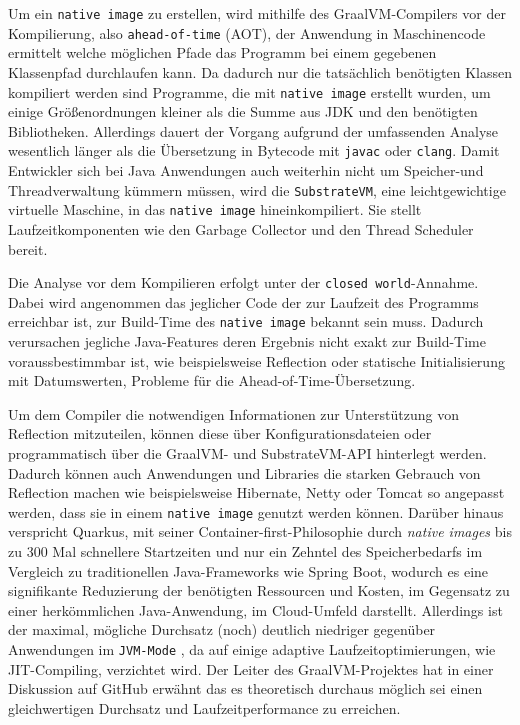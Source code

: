 Um ein \verb|native image| zu erstellen, wird mithilfe des GraalVM-Compilers vor der Kompilierung, also \verb|ahead-of-time| (AOT), der Anwendung in Maschinencode
ermittelt welche möglichen Pfade das Programm bei einem gegebenen Klassenpfad durchlaufen kann. Da dadurch nur die tatsächlich benötigten Klassen
kompiliert werden sind Programme, die mit \verb|native image| erstellt wurden, um einige Größenordnungen kleiner als die Summe aus
JDK und den benötigten Bibliotheken.
Allerdings dauert der Vorgang aufgrund der umfassenden Analyse wesentlich länger als die Übersetzung in Bytecode mit \verb|javac| oder \verb|clang|.
Damit Entwickler sich bei Java Anwendungen auch weiterhin nicht um Speicher-und Threadverwaltung kümmern müssen, wird die \verb|SubstrateVM|, eine
leichtgewichtige virtuelle Maschine, in das \verb|native image| hineinkompiliert.
Sie stellt Laufzeitkomponenten wie den Garbage Collector und den Thread Scheduler bereit.

Die Analyse vor dem Kompilieren erfolgt unter der \verb|closed world|-Annahme. Dabei wird angenommen das jeglicher Code der zur Laufzeit des Programms
erreichbar ist, zur Build-Time des \verb|native image| bekannt sein muss. Dadurch verursachen jegliche Java-Features deren Ergebnis nicht exakt
zur Build-Time voraussbestimmbar ist, wie beispielsweise Reflection oder statische Initialisierung mit Datumswerten, Probleme für die Ahead-of-Time-Übersetzung.

Um dem Compiler die notwendigen Informationen zur Unterstützung von Reflection mitzuteilen, können
diese über Konfigurationsdateien oder programmatisch über die GraalVM- und SubstrateVM-API hinterlegt werden.
Dadurch können auch Anwendungen und Libraries die starken Gebrauch von Reflection machen wie beispielsweise Hibernate, Netty oder Tomcat
so angepasst werden, dass sie in einem \verb|native image| genutzt werden können.
\parencite{GraalVMNativeImage}
Darüber hinaus verspricht Quarkus, mit seiner Container-first-Philosophie durch \textit{native images} bis zu 300 Mal schnellere Startzeiten
und nur ein Zehntel des Speicherbedarfs im Vergleich zu traditionellen Java-Frameworks wie Spring Boot, wodurch es eine signifikante Reduzierung
der benötigten Ressourcen und Kosten, im Gegensatz zu einer herkömmlichen Java-Anwendung, im Cloud-Umfeld darstellt.
\parencite{RedHatQuarkusInfografik}
Allerdings ist der maximal, mögliche Durchsatz (noch) deutlich niedriger gegenüber Anwendungen im \verb|JVM-Mode| , da auf einige adaptive
Laufzeitoptimierungen, wie JIT-Compiling, verzichtet wird.
Der Leiter des GraalVM-Projektes hat in einer Diskussion auf GitHub erwähnt das es theoretisch durchaus möglich sei einen gleichwertigen
Durchsatz und Laufzeitperformance zu erreichen\parencite{GraalWuerthinger}.

